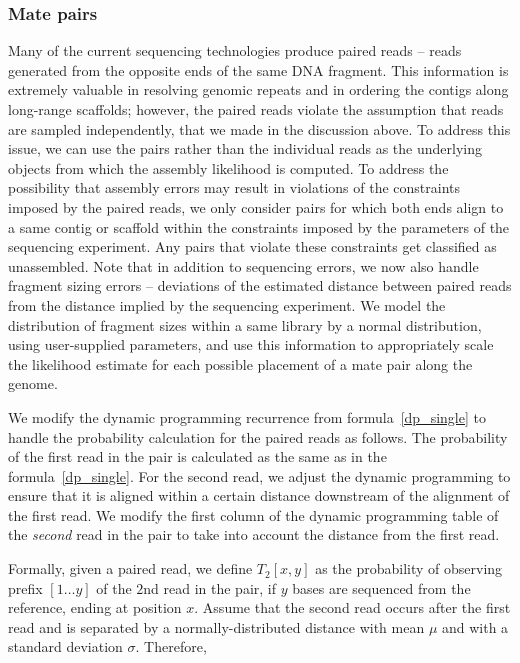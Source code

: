 \subsubsection{Mate pairs}
Many of the current sequencing technologies produce paired reads --
reads generated from the opposite ends of the same DNA fragment.  This
information is extremely valuable in resolving genomic repeats and in
ordering the contigs along long-range scaffolds; however, the paired
reads violate the assumption that reads are sampled independently,
that we made in the discussion above.  To address this issue, we can use the
pairs rather than the individual reads as the underlying objects from
which the assembly likelihood is computed.  To address the possibility
that assembly errors may result in violations of the constraints imposed by
the paired reads, we only consider pairs for which both ends align to
a same contig or scaffold within the constraints imposed by the
parameters of the sequencing experiment.  Any pairs that violate these
constraints get classified as unassembled.  Note that in addition to
sequencing errors, we now also handle fragment sizing errors --
deviations of the estimated distance between paired reads from the
distance implied by the sequencing experiment.  We model the
distribution of fragment sizes within a same library by a normal
distribution, using user-supplied parameters, and use this information
to appropriately scale the likelihood estimate for each possible
placement of a mate pair along the genome.

We modify the dynamic programming recurrence from formula~\eqref{dp_single} to handle the probability calculation for the paired reads as follows.
The probability of the first read in the pair is calculated as the same as in the formula~\eqref{dp_single}.  For the second read, we adjust the dynamic programming to ensure that it is aligned within a certain distance downstream of the alignment of the first read.
We modify the first column of the dynamic programming table of the \emph{second} read in the pair to take into account the distance from the first read.

Formally, given a paired read, we define $T_2[x,y]$ as the probability of observing prefix $[1 \ldots y]$ of the $2$nd read in the pair, if $y$ bases are sequenced from the reference, ending at position $x$.
Assume that the second read occurs after the first read and is separated by a normally-distributed distance with mean $\mu$ and with a standard deviation $\sigma$.
Therefore,

